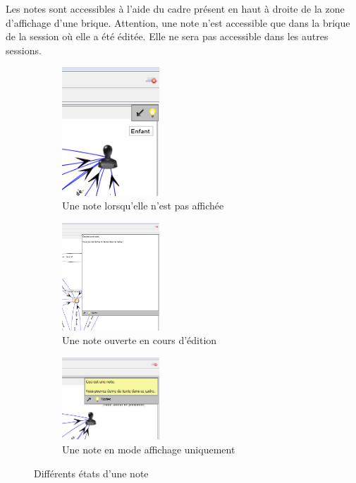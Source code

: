 Les notes sont accessibles à l'aide du cadre présent en haut à droite de la zone d'affichage d'une brique. Attention, une note n'est accessible que dans la brique de la session où elle a été éditée. Elle ne sera pas accessible dans les autres sessions.\\

\begin{figure}[h!]
\centering
\begin{subfigure}{\textwidth}

\centering
\includegraphics[width=0.4\textwidth]{images/note_fermee.png}
\caption{Une note lorsqu'elle n'est pas affichée}
\end{subfigure}
\begin{subfigure}{\textwidth}

\centering
\includegraphics[width=0.4\textwidth]{images/note_ouverte_edition.png}
\caption{Une note ouverte en cours d'édition}
\end{subfigure}
\begin{subfigure}{\textwidth}

\centering
\includegraphics[width=0.4\textwidth]{images/note_ouverte_pas_edition.png}
\caption{Une note en mode affichage uniquement}
\end{subfigure}
\caption{Différents états d'une note}
\end{figure}

